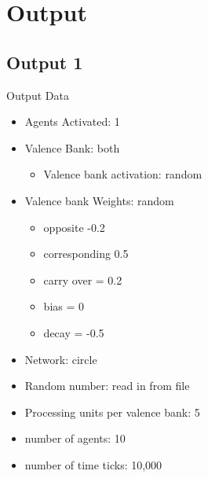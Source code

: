 \documentclass{article}\usepackage[]{graphicx}\usepackage[]{color}
\begin{document}
\newpage
\section{Output}
\subsection{Output 1}
\label{sec:output1}
Output Data
\begin{itemize}
  \item Agents Activated: 1
  \item Valence Bank: both
  \begin{itemize}
      \item Valence bank activation: random
  \end{itemize}
  \item Valence bank Weights: random
  \begin{itemize}
      \item opposite -0.2
      \item corresponding 0.5
      \item carry over = 0.2
      \item bias = 0
      \item decay = -0.5
  \end{itemize}
  \item Network: circle
  \item Random number: read in from file
  \item Processing units per valence bank: 5
  \item number of agents: 10
  \item number of time ticks: 10,000
\end{itemize}
\end{document}
